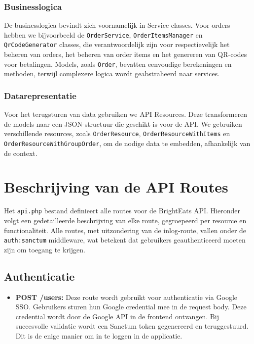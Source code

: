 \subsubsection{Businesslogica}

De businesslogica bevindt zich voornamelijk in Service classes. Voor orders hebben we bijvoorbeeld de \texttt{OrderService}, \texttt{OrderItemsManager} en \texttt{QrCodeGenerator} classes, die verantwoordelijk zijn voor respectievelijk het beheren van orders, het beheren van order items en het genereren van QR-codes voor betalingen. Models, zoals \texttt{Order}, bevatten eenvoudige berekeningen en methoden, terwijl complexere logica wordt geabstraheerd naar services.

\subsubsection{Datarepresentatie}

Voor het terugsturen van data gebruiken we API Resources. Deze transformeren de models naar een JSON-structuur die geschikt is voor de API. We gebruiken verschillende resources, zoals \texttt{OrderResource}, \texttt{OrderResourceWithItems} en \texttt{OrderResourceWithGroupOrder}, om de nodige data te embedden, afhankelijk van de context.

\section{Beschrijving van de API Routes}

Het \texttt{api.php} bestand definieert alle routes voor de Bright\-Eats API. Hieronder volgt een gedetailleerde beschrijving van elke route, gegroepeerd per resource en functionaliteit. Alle routes, met uitzondering van de inlog-route, vallen onder de \texttt{auth:sanctum} middleware, wat betekent dat gebruikers geauthenticeerd moeten zijn om toegang te krijgen.

\subsection{Authenticatie}

\begin{itemize}
  \item \textbf{POST /users:} Deze route wordt gebruikt voor authenticatie via Google SSO. Gebruikers sturen hun Google credential mee in de request body. Deze credential wordt door de Google API in de frontend ontvangen. Bij succesvolle validatie wordt een Sanctum token gegenereerd en teruggestuurd. Dit is de enige manier om in te loggen in de applicatie.
\end{itemize}

